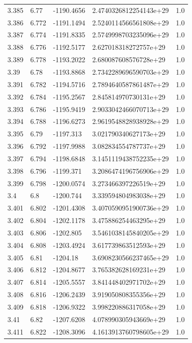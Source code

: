 \begin{tabular}{lllll}
3.385 & 6.77 & -1190.4656 & 2.4740326812254143e+29 & 1.0 \\
3.386 & 6.772 & -1191.1494 & 2.5240114566561808e+29 & 1.0 \\
3.387 & 6.774 & -1191.8335 & 2.5749998703235096e+29 & 1.0 \\
3.388 & 6.776 & -1192.5177 & 2.627018318272757e+29 & 1.0 \\
3.389 & 6.778 & -1193.2022 & 2.680087608576728e+29 & 1.0 \\
3.39 & 6.78 & -1193.8868 & 2.7342289696590703e+29 & 1.0 \\
3.391 & 6.782 & -1194.5716 & 2.7894640587861487e+29 & 1.0 \\
3.392 & 6.784 & -1195.2567 & 2.845814970730131e+29 & 1.0 \\
3.393 & 6.786 & -1195.9419 & 2.9033042466070713e+29 & 1.0 \\
3.394 & 6.788 & -1196.6273 & 2.9619548828938928e+29 & 1.0 \\
3.395 & 6.79 & -1197.313 & 3.021790340627173e+29 & 1.0 \\
3.396 & 6.792 & -1197.9988 & 3.082834554787737e+29 & 1.0 \\
3.397 & 6.794 & -1198.6848 & 3.1451119438752235e+29 & 1.0 \\
3.398 & 6.796 & -1199.371 & 3.2086474196756906e+29 & 1.0 \\
3.399 & 6.798 & -1200.0574 & 3.273466397226519e+29 & 1.0 \\
3.4 & 6.8 & -1200.744 & 3.339594804983038e+29 & 1.0 \\
3.401 & 6.802 & -1201.4308 & 3.4070590951900736e+29 & 1.0 \\
3.402 & 6.804 & -1202.1178 & 3.475886254463295e+29 & 1.0 \\
3.403 & 6.806 & -1202.805 & 3.5461038145840205e+29 & 1.0 \\
3.404 & 6.808 & -1203.4924 & 3.617739863512593e+29 & 1.0 \\
3.405 & 6.81 & -1204.18 & 3.6908230566237465e+29 & 1.0 \\
3.406 & 6.812 & -1204.8677 & 3.765382628169231e+29 & 1.0 \\
3.407 & 6.814 & -1205.5557 & 3.841448402971702e+29 & 1.0 \\
3.408 & 6.816 & -1206.2439 & 3.919050808355356e+29 & 1.0 \\
3.409 & 6.818 & -1206.9322 & 3.998220886317058e+29 & 1.0 \\
3.41 & 6.82 & -1207.6208 & 4.078990305943669e+29 & 1.0 \\
3.411 & 6.822 & -1208.3096 & 4.1613913760798605e+29 & 1.0 \\

\end{tabular}
